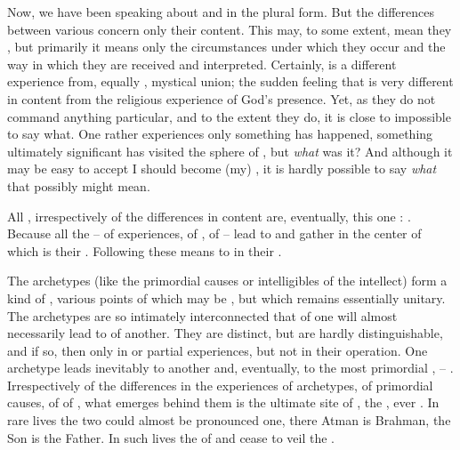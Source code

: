 \pa
Now, we have been speaking about  and  in the
plural form. But 
the differences between various  concern
only their content. This may, to some extent, mean  they ,
but primarily it means only the circumstances under which they occur and
the way in which they are received and interpreted.
Certainly,   is a different experience from,
equally , 
mystical union; the sudden feeling that 
is very different in content from the religious experience of God's presence.
Yet, as   they 
do not command anything particular, and to the extent they do, it is
close to impossible to say what. One rather experiences only 
something has happened, something ultimately significant has visited
the sphere of , but {\em what} was it? And although it may be
easy to accept  I should become (my) , it is hardly
possible to say {\em what} that possibly might mean.

All , irrespectively of the differences in content are, eventually,
this one : . Because all the  -- of
 experiences, of , of  -- lead to and gather in
the center of  which is their . Following these 
means to  in their .

The archetypes (like the primordial causes or intelligibles of the intellect)
form a kind of , various 
points of which may be , but which remains essentially
unitary. The archetypes are so intimately interconnected that
 of one will almost necessarily lead to
 of another. They are distinct, but are hardly
distinguishable, and if so, then only in  or partial
experiences, but not in their operation. One archetype leads
inevitably to another and, eventually, to the most primordial
,  --
.
Irrespectively of the differences in the experiences of archetypes, of
primordial causes, of  of , what emerges behind them
is the ultimate site of , the , ever
.  In rare lives the two could almost be pronounced one,
there Atman is Brahman, the Son is the Father. In such lives the
 of  and  cease to veil the .


